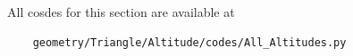 \documentclass[10pt]{book}
\begin{document}
\begin{enumerate}[label=\thesection.\arabic*.,ref=\thesection.\theenumi]
All cosdes for this section are available at
\begin{lstlisting}
	geometry/Triangle/Altitude/codes/All_Altitudes.py
\end{lstlisting}
\end{enumerate}
\backmatter
\appendix
\latexprintindex
\end{document}
